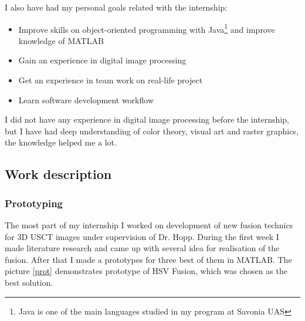 \documentclass[english]{article}
\begin{document}
I also have had my personal goals related with the internship:
\begin{itemize}
\item Improve skills on object-oriented programming with Java\footnote{Java is one of the main languages studied in my program at Savonia UAS} and improve knowledge of MATLAB
\item Gain an experience in digital image processing
\item Get an experience in team work on real-life project
\item Learn software development workflow
\end{itemize}
I did not have any experience in digital image processing before the internship, but I have had deep understanding of color theory, visual art and raster graphics, the knowledge helped me a lot.

\subsection{Work description}
\subsubsection{Prototyping}

The most part of my internship I worked on development of new fusion technics for 3D USCT images under supervision of Dr. Hopp. During the first week I made literature research and came up with several idea for realisation of the fusion. After that I made a prototypes for three best of them in MATLAB. The picture \ref{prot} demonstrates prototype of HSV Fusion, which was chosen as the best solution.\\
\end{document}
